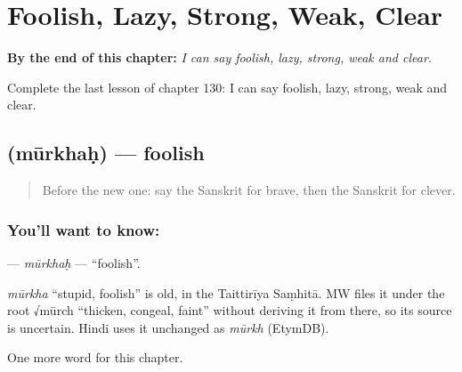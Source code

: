 
\chapter{Foolish, Lazy, Strong, Weak, Clear}
\label{ch:sa-foolish-lazy-strong-weak-clear}

\begin{chapteropening}
\textbf{By the end of this chapter:} \emph{I can say foolish, lazy, strong, weak and clear.}

Complete the last lesson of chapter 130: I can say foolish, lazy, strong, weak and clear.
\end{chapteropening}

\section[\texorpdfstring{\sk{मूर्खः} (mūrkhaḥ)}{मूर्खः (mūrkhaḥ)}]{ (mūrkhaḥ) — foolish}

\label{lesson:SA-C130-murkhah}



\begin{quote}
Before the new one: say the Sanskrit for brave, then the Sanskrit for clever.
\end{quote}

\subsection*{You'll want to know: }
\textbf{} — \emph{mūrkhaḥ} — \textquotedblleft{}foolish\textquotedblright{}.

\begin{cousinweb}
\emph{mūrkha} \textquotedblleft{}stupid, foolish\textquotedblright{} is old, in the Taittirīya Saṃhitā. MW files it under the root √mūrch \textquotedblleft{}thicken, congeal, faint\textquotedblright{} without deriving it from there, so its source is uncertain. Hindi uses it unchanged as \emph{mūrkh} (EtymDB).
\end{cousinweb}

\begin{grammarlens}[title={What you've built}]
One more word for this chapter.
\end{grammarlens}

